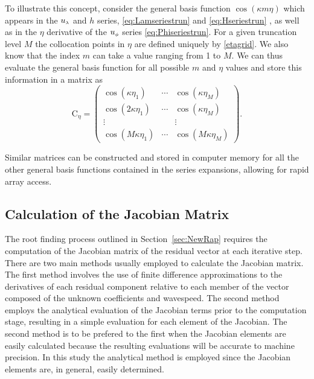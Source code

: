 To illustrate this concept, consider the general basis function $\cos(\kappa m \eta)$ which appears in the ${u_{\scriptscriptstyle \lambda}}$ and $h$ series, \eqref{eq:Lamseriestrun} and \eqref{eq:Hseriestrun} , as well as in the $\eta$ derivative of the ${u_{\scriptscriptstyle \phi}}$ series \eqref{eq:Phiseriestrun}. For a given truncation level $M$ the collocation points in $\eta$ are defined uniquely by \eqref{etagrid}. We also know that the index $m$ can take a value ranging from 1 to $M$. We can thus evaluate the general basis function for all possible $m$ and $\eta$ values and store this information in a matrix as
\begin{equation}
\text{C}_{\eta}=\begin{pmatrix} \cos(\kappa \eta_1) & \cdots & \cos(\kappa \eta_M)\\
 \cos(2\kappa \eta_1) & \cdots & \cos(\kappa \eta_M)\\
\vdots &  & \vdots \\
\cos(M \kappa \eta_1) & \cdots & \cos(M \kappa \eta_M) \end{pmatrix}.
\end{equation}

Similar matrices can be constructed and stored in computer memory for all the other general basis functions contained in the series expansions, allowing for rapid array access. 

\subsection{Calculation of the Jacobian Matrix} 
The root finding process outlined in Section~\ref{sec:NewRap} requires the computation of the Jacobian matrix of the residual vector at each iterative step. There are two main methods usually employed to calculate the Jacobian matrix. The first method involves the use of finite difference approximations to the derivatives of each residual component relative to each member of the vector composed of the unknown coefficients and wavespeed. The second method employs the analytical evaluation of the Jacobian terms prior to the computation stage, resulting in a simple evaluation for each element of the Jacobian. The second method is to be prefered to the first when the Jacobian elements are easily calculated because the resulting evaluations will be accurate to machine precision. In this study the analytical method is employed since the Jacobian elements are, in general, easily determined.

